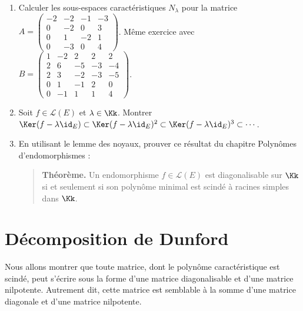 \documentclass[12pt, class=report,crop=false]{standalone}
\begin{document}
 
\begin{miniexercices}
\sauteligne
\begin{enumerate}
  \item Calculer les sous-espaces caractéristiques $N_\lambda$ pour la matrice  
  $A = \left(\begin{smallmatrix}
-2 & -2 & -1 & -3 \\
0 & -2 & 0 & 3 \\
0 & 1 & -2 & 1 \\
0 & -3 & 0 & 4
  \end{smallmatrix}\right)$.
  Même exercice avec
  $B = \left(\begin{smallmatrix}
1 & -2 & 2 & 2 & 2 \\
2 & 6 & -5 & -3 & -4 \\
2 & 3 & -2 & -3 & -5 \\
0 & 1 & -1 & 2 & 0 \\
0 & -1 & 1 & 1 & 4
  \end{smallmatrix}\right)$.

  \item Soit $f \in \mathcal{L}(E)$ et $\lambda \in \Kk$. Montrer $\Ker(f-\lambda \id_E) \subset \Ker(f-\lambda \id_E)^2 \subset \Ker(f-\lambda \id_E)^3 \subset \cdots$.
  
  \item En utilisant le lemme des noyaux, prouver ce résultat du chapitre \og{}Polynômes d'endomorphismes\fg{} :
  \begin{quote}
  \og{}\textbf{Théorème.} Un endomorphisme $f \in\mathcal{L}(E)$ est diagonalisable sur $\Kk$ si et seulement si son polynôme minimal est scindé à racines simples dans $\Kk$.\fg{}
  \end{quote}
\end{enumerate}
\end{miniexercices}




\section{Décomposition de Dunford}

Nous allons montrer que toute matrice, dont le polynôme caractéristique est scindé, peut s'écrire sous la forme d'une matrice diagonalisable et d'une matrice nilpotente. Autrement dit, cette matrice est semblable à la somme d'une matrice diagonale et d'une matrice nilpotente.
\end{document}
